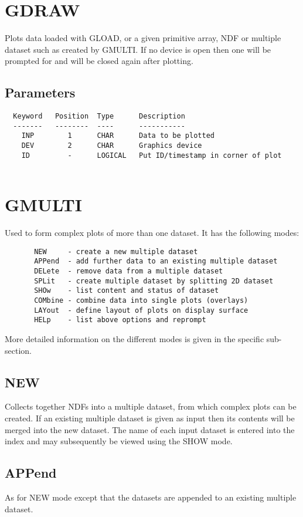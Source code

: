 \documentclass{book}
\renewcommand{\_}{{\tt\char'137}}     %
\begin{document}
\section{GDRAW}
Plots data loaded with GLOAD, or a given primitive array, NDF
or multiple dataset such as created by GMULTI. If no device
is open then one will be prompted for and will be closed again
after plotting.
 
\subsection{Parameters}
\begin{verbatim}
  Keyword   Position  Type      Description
  -------   --------  ----      -----------
    INP        1      CHAR      Data to be plotted
    DEV        2      CHAR      Graphics device
    ID         -      LOGICAL   Put ID/timestamp in corner of plot
 
\end{verbatim}\section{GMULTI}
Used to form complex plots of more than one dataset. It has the
following modes:
 
\begin{verbatim}
       NEW     - create a new multiple dataset
       APPend  - add further data to an existing multiple dataset
       DELete  - remove data from a multiple dataset
       SPLit   - create multiple dataset by splitting 2D dataset
       SHOw    - list content and status of dataset
       COMbine - combine data into single plots (overlays)
       LAYout  - define layout of plots on display surface
       HELp    - list above options and reprompt
 \end{verbatim}
More detailed information on the different modes is given in the
specific sub-section.
 
\subsection{NEW}
Collects together NDFs into a multiple dataset, from which complex
plots can be created. If an existing multiple dataset is given as
input then its contents will be merged into the new dataset. The
name of each input dataset is entered into the index and may
subsequently be viewed using the SHOW mode.
 
\subsection{APPend}
As for NEW mode except that the datasets are appended to an existing
multiple dataset.
 
\end{document}

